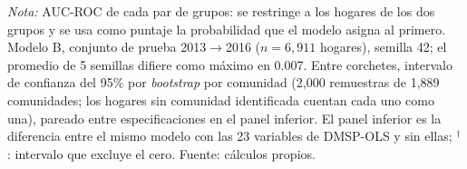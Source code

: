 \begin{table}[H]
{\begin{tabular}{lcccccc}
    \bottomrule
  \end{tabular}%
  }
  \begin{minipage}{0.95\textwidth}
    \vspace{4pt}
    \footnotesize \textit{Nota:} AUC-ROC de cada par de grupos: se restringe a los hogares de los dos grupos y se usa como puntaje la probabilidad que el modelo asigna al primero. Modelo B, conjunto de prueba 2013$\to$2016 ($n=6{,}911$ hogares), semilla 42; el promedio de 5 semillas difiere como máximo en 0.007. Entre corchetes, intervalo de confianza del 95\% por \emph{bootstrap} por comunidad (2{,}000 remuestras de 1{,}889 comunidades; los hogares sin comunidad identificada cuentan cada uno como una), pareado entre especificaciones en el panel inferior. El panel inferior es la diferencia entre el mismo modelo con las 23 variables de DMSP-OLS y sin ellas; $^{\dagger}$: intervalo que excluye el cero. Fuente: cálculos propios.
  \end{minipage}
\end{table}
